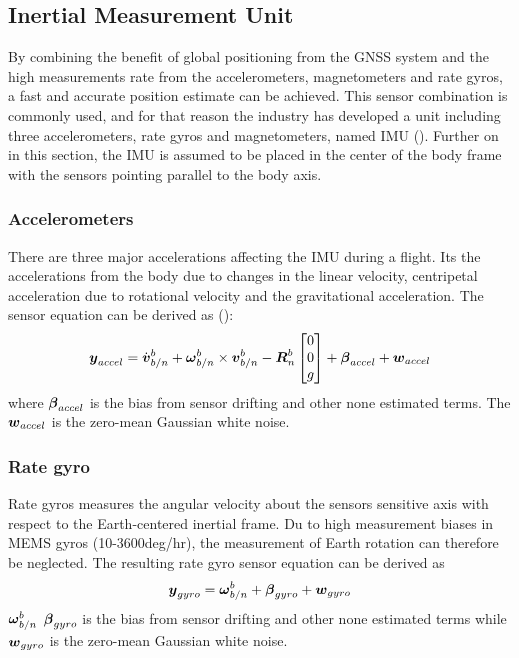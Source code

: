 \subsection{Inertial Measurement Unit}\label{sec:imu}
By combining the benefit of global positioning from the \gls{GNSS} system and the high measurements rate from the accelerometers, magnetometers and rate gyros, a fast and accurate position estimate can be achieved. This sensor combination is commonly used, and for that reason the industry has developed a unit including three accelerometers, rate gyros and magnetometers, named \gls{IMU} (\cite{beard2012small}). Further on in this section, the \gls{IMU} is assumed to be placed in the center of the body frame with the sensors pointing parallel to the body axis.

\subsubsection*{Accelerometers}\label{sec:accel}
There are three major accelerations affecting the \gls{IMU} during a flight. Its the accelerations from the body due to changes in the linear velocity, centripetal acceleration due to rotational velocity and the gravitational acceleration. The sensor equation can be derived as (\cite{vik2009integrated}):
\begin{equation}
  \boldsymbol{y}_{accel}=
  \dot{\boldsymbol{v}}_{b/n}^{b}+\boldsymbol{\omega}_{b/n}^{b}\times\boldsymbol{v}_{b/n}^{b}-
  \boldsymbol{R}_{n}^{b}
  \begin{bmatrix}
    0\\
    0\\
    g
  \end{bmatrix}
  +\boldsymbol{\beta}_{accel}
  +\boldsymbol{w}_{accel}
\end{equation}
where $\boldsymbol{\beta}_{accel}$ is the bias from sensor drifting and other none estimated terms. The $\boldsymbol{w}_{accel}$ is the zero-mean Gaussian white noise.

\subsubsection*{Rate gyro}\label{sec:rateGyro}
Rate gyros measures the angular velocity about the sensors sensitive axis with respect to the Earth-centered inertial frame. Du to high measurement biases in MEMS gyros (10-3600deg/hr), the measurement of Earth rotation can therefore be neglected. The resulting rate gyro sensor equation can be derived as
\begin{equation}\label{eq:rateGyro}
  \boldsymbol{y}_{gyro}=\boldsymbol{\omega}_{b/n}^{b}+\boldsymbol{\beta}_{gyro}+\boldsymbol{w}_{gyro}
\end{equation}
$\boldsymbol{\omega}_{b/n}^{b}$ $\boldsymbol{\beta}_{gyro}$ is the bias from sensor drifting and other none estimated terms while 
$\boldsymbol{w}_{gyro}$ is the zero-mean Gaussian white noise.


